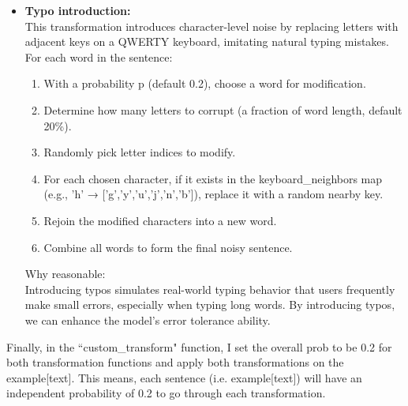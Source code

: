 \documentclass{article}
\begin{document}
\begin{itemize}[leftmargin=1em]
    \item \textbf{Typo introduction:}\\
    This transformation introduces character-level noise by replacing letters with adjacent keys on a QWERTY keyboard, imitating natural typing mistakes. \\
    For each word in the sentence:
    \begin{enumerate}
        \item With a probability p (default 0.2), choose a word for modification.
        \item Determine how many letters to corrupt (a fraction of word length, default 20\%).
        \item Randomly pick letter indices to modify.
        \item For each chosen character, if it exists in the keyboard\_neighbors map (e.g., 'h' → ['g','y','u','j','n','b']), replace it with a random nearby key.
        \item Rejoin the modified characters into a new word.
        \item Combine all words to form the final noisy sentence.
    \end{enumerate}
    Why reasonable:\\
    Introducing typos simulates real-world typing behavior that users frequently make small errors, especially when typing long words. By introducing typos, we can enhance the model's error tolerance ability.
\end{itemize}
Finally, in the ``custom\_transform" function, I set the overall prob to be 0.2 for both transformation functions and apply both transformations on the example[text]. This means, each sentence (i.e. example[text]) will have an independent probability of 0.2 to go through each transformation.  






\end{document}
